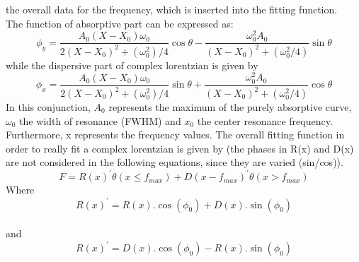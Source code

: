 \documentclass[12pt]{report}
\begin{document}
the overall data for the frequency, which is inserted into the fitting function.\\
The function of absorptive part can be expressed as:
\begin{equation}
\phi_y= \frac{A_0 (X-X_0 )\omega_0}{2(X-X_0 )^2+(\omega_0^2)/4}\cos\theta-\frac{\omega_0^2A_0}{(X-X_0 )^2+(\omega_0^2/4)}\sin\theta
\end{equation}
while the dispersive part of complex lorentzian is given by 
\begin{equation}
\phi_x= \frac{A_0 (X-X_0 )\omega_0}{2(X-X_0 )^2+(\omega_0^2)/4}\sin\theta+\frac{\omega_0^2A_0}{(X-X_0 )^2+(\omega_0^2/4)}\cos\theta
\end{equation}
In this conjunction, $A_0$ represents the maximum of the purely absorptive curve, $\omega_0$ the width
of resonance (FWHM) and $x_0$ the center resonance frequency. Furthermore, x represents
the frequency values.
The overall fitting function in order to really fit a complex lorentzian is given by (the
phases in R(x) and D(x) are not considered in the following equations, since they are varied
(sin/cos)).\\


\begin{equation}
F = R(x)^{'}\theta(x \leq f_{max}) + D(x-f_{max})^{'}\theta(x > f_{max})
\end{equation}
Where 
\begin{equation}
R(x)^{'}=R(x) . \cos(\phi_0) + D(x) .\sin(\phi_0)
\end{equation}\\
and
\begin{equation}
R(x)^{'}=D(x) . \cos(\phi_0) - R(x) .\sin(\phi_0)
\end{equation}
\end{document}
